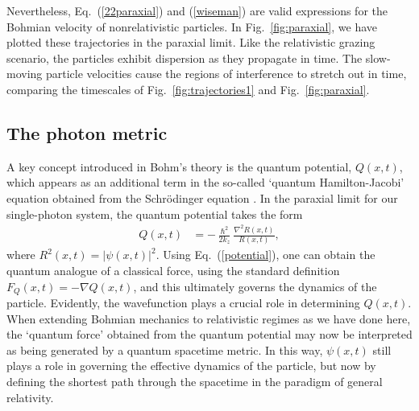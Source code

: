 \documentclass[
prx
,twocolumn
,nofootinbib
,floatfix
,superscriptaddress
]{revtex4-2}
\begin{document}
Nevertheless, Eq.\ (\ref{22paraxial}) and (\ref{wiseman}) are valid expressions for the Bohmian velocity of nonrelativistic particles. In Fig.\ \ref{fig:paraxial}, we have plotted these trajectories in the paraxial limit. Like the relativistic grazing scenario, the particles exhibit dispersion as they propagate in time. The slow-moving particle velocities cause the regions of interference to stretch out in time, comparing the timescales of Fig.\ \ref{fig:trajectories1} and Fig.\ \ref{fig:paraxial}. 


\subsection{The photon metric}
A key concept introduced in Bohm's theory is the quantum potential, $Q(x,t)$, which appears as an additional term in the so-called `quantum Hamilton-Jacobi' equation obtained from the Schr\"odinger equation \cite{bohm2006undivided}. In the paraxial limit for our single-photon system, the quantum potential takes the form
\begin{align}\label{potential}
    Q(x,t) &= - \frac{\hslash^2}{2k_z} \frac{\nabla^2 R(x,t)}{R(x,t)} ,
\end{align}
where $R^2(x,t) = | \psi(x,t) |^2$. Using Eq.\ (\ref{potential}), one can obtain the quantum analogue of a classical force, using the standard definition $F_Q(x,t) = - \nabla Q(x,t)$, and this ultimately governs the dynamics of the particle. Evidently, the wavefunction plays a crucial role in determining $Q(x,t)$. When extending Bohmian mechanics to relativistic regimes as we have done here, the `quantum force' obtained from the quantum potential may now be interpreted as being generated by a quantum spacetime metric. In this way, $\psi(x,t)$ still plays a role in governing the effective dynamics of the particle, but now by defining the shortest path through the spacetime in the paradigm of general relativity. 
\end{document}
